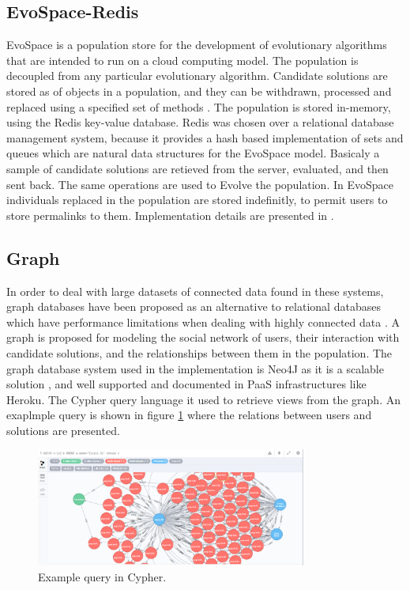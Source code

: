   \subsection{EvoSpace-Redis}
EvoSpace is a population store \cite{Evospace}  for the development of 
evolutionary algorithms that are intended to run on a cloud computing model. 
The population is decoupled from any particular evolutionary algorithm. 
Candidate solutions are stored as of objects in a population, and they can be withdrawn, 
processed and replaced using a specified set of methods \cite{GValdez2015}. The population
is stored in-memory, using the Redis key-value database. Redis was chosen over a relational 
database management system, because it provides a hash based implementation of sets and 
queues which are natural data structures for the EvoSpace model. Basicaly a sample of 
candidate solutions are retieved from the server, evaluated, and then sent back. 
The same operations are used to Evolve the population. In EvoSpace individuals replaced 
in the population are stored indefinitly, to permit users to store permalinks to them.
Implementation details are presented in \cite{garcia2013evospace}.

\subsection{Graph}
  In order to deal with large datasets of connected data found in these systems,
  graph databases \cite{angles2012comparison} have been proposed as an alternative to relational databases 
  which have performance limitations when dealing with highly connected data \cite{holzschuher2013performance}.
  A graph is proposed for modeling the social network of users, their interaction with 
  candidate solutions, and the relationships between them in the population.
  The graph database system used in the implementation is Neo4J as it is
  a scalable solution \cite{miller2013graph,holzschuher2013performance}, and well supported and documented
  in PaaS infrastructures like Heroku. The Cypher query language it used to retrieve views from the graph.
  An exaplmple query is shown in figure \ref{fig:cypher} where the relations between users and solutions 
  are presented.
  
  \begin{figure}[!t]
    \centering
        \includegraphics[width=3.5in]{img/gui-neo.png}
    \caption{Example query in Cypher.}
    \label{fig:cypher}
  \end{figure}

